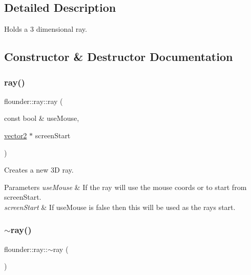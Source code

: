 \subsection{Detailed Description}
Holds a 3 dimensional ray. 



\subsection{Constructor \& Destructor Documentation}
\mbox{\label{classflounder_1_1ray_adc2baacdaf66bd982c3b48827d53d103}} 
\subsubsection{\texorpdfstring{ray()}{ray()}}
{\footnotesize\ttfamily flounder\+::ray\+::ray (\begin{DoxyParamCaption}\item[{const bool \&}]{use\+Mouse,  }\item[{\hyperlink{classflounder_1_1vector2}{vector2} $\ast$}]{screen\+Start }\end{DoxyParamCaption})}



Creates a new 3D ray. 


\begin{DoxyParams}{Parameters}
{\em use\+Mouse} & If the ray will use the mouse coords or to start from screen\+Start. \\
\hline
{\em screen\+Start} & If use\+Mouse is false then this will be used as the rays start. \\
\hline
\end{DoxyParams}
\mbox{\label{classflounder_1_1ray_a22e1374c250bbad557f01428b95d7fe1}} 
\subsubsection{\texorpdfstring{$\sim$ray()}{~ray()}}
{\footnotesize\ttfamily flounder\+::ray\+::$\sim$ray (\begin{DoxyParamCaption}{ }\end{DoxyParamCaption})}



